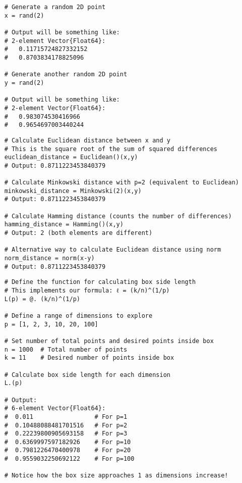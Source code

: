 \begin{tcolorbox}[width=\textwidth, left=-6mm, sharp corners, boxrule=0pt, title=\textbf{Create two random 2D points}]
  \begin{verbatim}
    # Generate a random 2D point
    x = rand(2) 

    # Output will be something like:
    # 2-element Vector{Float64}:
    #   0.11715724827332152
    #   0.8703834178825096

    # Generate another random 2D point
    y = rand(2)

    # Output will be something like:
    # 2-element Vector{Float64}:
    #   0.983074530416966
    #   0.9654697003440244
  \end{verbatim}
\end{tcolorbox}

\begin{tcolorbox}[width=\textwidth, left=-6mm, sharp corners, boxrule=0pt, title=\textbf{Calculate different distance metrics}]
  \begin{verbatim}
    # Calculate Euclidean distance between x and y
    # This is the square root of the sum of squared differences
    euclidean_distance = Euclidean()(x,y)
    # Output: 0.8711223453840379

    # Calculate Minkowski distance with p=2 (equivalent to Euclidean)
    minkowski_distance = Minkowski(2)(x,y)
    # Output: 0.8711223453840379

    # Calculate Hamming distance (counts the number of differences)
    hamming_distance = Hamming()(x,y)
    # Output: 2 (both elements are different)

    # Alternative way to calculate Euclidean distance using norm
    norm_distance = norm(x-y)
    # Output: 0.8711223453840379
  \end{verbatim}
\end{tcolorbox}

\begin{tcolorbox}[width=\textwidth, left=-6mm, sharp corners, boxrule=0pt, title=\textbf{Implementing the box size formula}]
  \begin{verbatim}
    # Define the function for calculating box side length
    # This implements our formula: ℓ = (k/n)^(1/p)
    L(p) = @. (k/n)^(1/p)

    # Define a range of dimensions to explore
    p = [1, 2, 3, 10, 20, 100]

    # Set number of total points and desired points inside box
    n = 1000  # Total number of points
    k = 11    # Desired number of points inside box

    # Calculate box side length for each dimension
    L.(p)

    # Output:
    # 6-element Vector{Float64}:
    #  0.011                 # For p=1
    #  0.10488088481701516   # For p=2
    #  0.22239800905693158   # For p=3
    #  0.6369997597182926    # For p=10
    #  0.7981226470400978    # For p=20
    #  0.9559032250692122    # For p=100

    # Notice how the box size approaches 1 as dimensions increase!
  \end{verbatim}
\end{tcolorbox}

